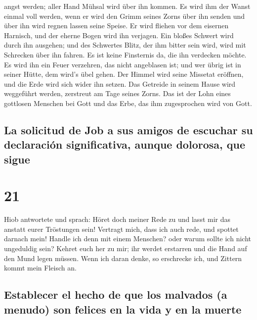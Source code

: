 angst werden; aller Hand Mühsal wird über ihn kommen.  Es
wird ihm der Wanst einmal voll werden, wenn er wird den Grimm seines
Zorns über ihn senden und über ihn wird regnen lassen seine Speise.
 Er wird fliehen vor dem eisernen Harnisch, und der
eherne Bogen wird ihn verjagen.  Ein bloßes Schwert wird
durch ihn ausgehen; und des Schwertes Blitz, der ihm bitter sein wird,
wird mit Schrecken über ihn fahren.  Es ist keine
Finsternis da, die ihn verdecken möchte. Es wird ihn ein Feuer
verzehren, das nicht angeblasen ist; und wer übrig ist in seiner Hütte,
dem wird's übel gehen.  Der Himmel wird seine Missetat
eröffnen, und die Erde wird sich wider ihn setzen.  Das
Getreide in seinem Hause wird weggeführt werden, zerstreut am Tage
seines Zorns.  Das ist der Lohn eines gottlosen Menschen
bei Gott und das Erbe, das ihm zugesprochen wird von Gott.

\hypertarget{la-solicitud-de-job-a-sus-amigos-de-escuchar-su-declaraciuxf3n-significativa-aunque-dolorosa-que-sigue}{%
\subsection{La solicitud de Job a sus amigos de escuchar su declaración
significativa, aunque dolorosa, que
sigue}\label{la-solicitud-de-job-a-sus-amigos-de-escuchar-su-declaraciuxf3n-significativa-aunque-dolorosa-que-sigue}}

\hypertarget{section-20}{%
\section{21}\label{section-20}}

 Hiob antwortete und sprach:  Höret doch
meiner Rede zu und lasst mir das anstatt eurer Tröstungen sein!
 Vertragt mich, dass ich auch rede, und spottet darnach
mein!  Handle ich denn mit einem Menschen? oder warum
sollte ich nicht ungeduldig sein?  Kehret euch her zu mir;
ihr werdet erstarren und die Hand auf den Mund legen müssen.
 Wenn ich daran denke, so erschrecke ich, und Zittern
kommt mein Fleisch an.

\hypertarget{establecer-el-hecho-de-que-los-malvados-a-menudo-son-felices-en-la-vida-y-en-la-muerte}{%
\subsection{Establecer el hecho de que los malvados (a menudo) son
felices en la vida y en la
muerte}\label{establecer-el-hecho-de-que-los-malvados-a-menudo-son-felices-en-la-vida-y-en-la-muerte}}


